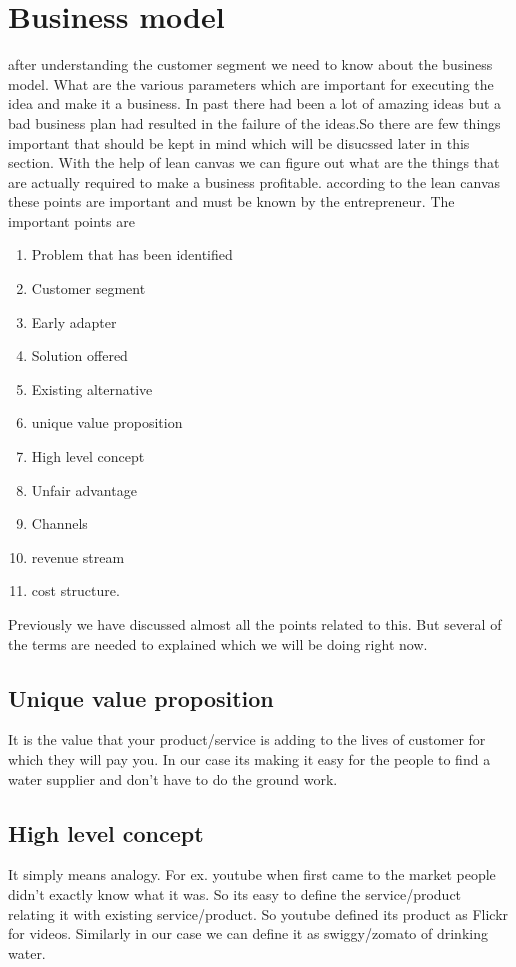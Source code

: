 \documentclass[a4paper, 12pt]{report}
\begin{document}
\section{Business model}
after understanding the customer segment we need to know about the business model. What are the various parameters which are important for
executing the idea and make it a business. In past there had been a lot of  amazing ideas but a bad business plan had resulted in the failure of the 
ideas.So there are few things important that should be kept in mind which will be disucssed later in this section. With the help of lean 
canvas we can figure out what are the things that are actually required to make a business profitable. according to the lean canvas these points are
important and must be known by the entrepreneur. The important points are
\begin{enumerate}
    \item Problem that has been identified
    \item Customer segment
    \item Early adapter
    \item Solution offered
    \item Existing alternative
    \item unique value proposition
    \item High level concept
    \item Unfair advantage
    \item Channels
    \item revenue stream
    \item cost structure.
\end{enumerate}
Previously we have discussed almost all the points related to this. But several of the terms are needed to explained which we will be doing right now.

\subsection[short]{Unique value proposition}
It is the value that your product/service is adding to the lives of customer for which they will pay you. In our case its making it easy 
for the people to find a water supplier and don't have to do the ground work. 

\subsection[short]{High level concept}
It simply means analogy. For ex. youtube when first came to the market people didn't exactly know what it was. So its easy to define the
service/product relating it with existing service/product. So youtube defined its product as Flickr for videos. Similarly in our case we can
define it as swiggy/zomato of drinking water.
\end{document}
